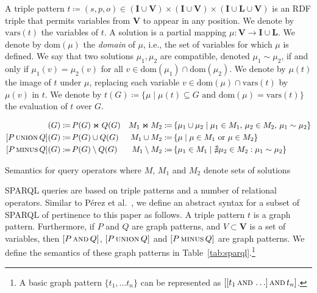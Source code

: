 \documentclass{llncs}
\newcommand{\I}{\ensuremath{\mathbf{I}}\xspace}
\renewcommand{\L}{\ensuremath{\mathbf{L}}\xspace}
\newcommand{\V}{\ensuremath{\mathbf{V}}\xspace}
\newcommand{\ssyn}[3]{[\ensuremath{#1\,\textsc{#2}\,#3}]}
\newcommand{\sand}[2]{\ssyn{#1}{and}{#2}}
\newcommand{\suni}[2]{\ssyn{#1}{union}{#2}}
\newcommand{\sminus}[2]{\ssyn{#1}{minus}{#2}}
\newcommand{\ssel}[2]{\ensuremath{\textsc{select}_{#2}#1}}
\newcommand{\dom}[1]{\ensuremath{\mathrm{dom}(#1)}}
\newcommand{\vars}[1]{\ensuremath{\mathrm{vars}(#1)}}
\newcommand{\com}[2]{\ensuremath{#1 \sim #2}}
\def\ojoin{\setbox0=\hbox{$\bowtie$}%
	\rule[0.18ex]{.25em}{.5pt}\llap{\rule[.9ex]{.25em}{.5pt}}}
\def\loj{\mathbin{\ojoin\mkern-5.8mu\bowtie}}
\newcommand{\da}{\ensuremath{:\nolinebreak\mkern-1.2mu\nolinebreak=}}
\begin{document}
A triple pattern $t \coloneqq (s,p,o) \in (\I \cup \V) \times (\I \cup \V) \times (\I \cup \L \cup \V)$ is an RDF triple that permits variables from $\V$ to appear in any position. We denote by $\vars{t}$ the variables of $t$. A solution is a partial mapping $\mu : \V \rightarrow \I \cup \L$. We denote by $\dom{\mu}$ the \textit{domain} of $\mu$, i.e., the set of variables for which $\mu$ is defined. We say that two solutions $\mu_1, \mu_2$ are compatible, denoted $\mu_1 \sim \mu_2$, if and only if $\mu_1(v) = \mu_2(v)$ for all $v \in \dom{\mu_1} \cap \dom{\mu_2}$. We denote by $\mu(t)$ the image of $t$ under $\mu$, replacing each variable $v \in \dom{\mu} \cap \vars{t}$ by $\mu(v)$ in $t$. We denote by $t(G) \coloneqq \{ \mu \mid \mu(t) \subseteq G\text{ and }\dom{\mu} = \vars{t} \}$ the evaluation of $t$ over $G$.

\begin{table}[t]
{\footnotesize
\begin{align*}
\sand{P}{Q}(G) \da &\, P(G) \Join Q(G) & M_1 \Join M_2 \da &\, \{ \mu_1 \cup \mu_2 \mid \mu_1 \in M_1,\, \mu_2 \in M_2,\, \com{\mu_1}{\mu_2} \} \\
\suni{P}{Q}(G) \da &\, P(G) \cup Q(G) & M_1 \cup M_2 \da &\, \{ \mu \mid \mu \in M_1\text{ or }\mu \in M_2 \} \\
\sminus{P}{Q}(G) \da &\, P(G) \setminus Q(G) &  M_1 \setminus M_2 \da &\, \{ \mu_1 \in M_1 \mid \nexists \mu_2 \in M_2 : \com{\mu_1}{\mu_2} \} \\
\end{align*}}
\vspace{-1cm}
\caption{Semantics for query operators where $M$, $M_1$ and $M_2$ denote sets of solutions\label{tab:sparql}}
\end{table}

SPARQL queries are based on triple patterns and a number of relational operators. Similar to Pérez et al.~\cite{PerezAG09}, we define an abstract syntax for a subset of SPARQL of pertinence to this paper as follows. A triple pattern $t$ is a graph pattern. Furthermore, if $P$ and $Q$ are graph patterns, and $V \subset \V$ is a set of variables, then $\sand{P}{Q}$, $\suni{P}{Q}$ and $\sminus{P}{Q}$ are graph patterns. We define the semantics of these graph patterns in Table~\ref{tab:sparql}.\footnote{A basic graph pattern $\{ t_1, \ldots t_n\}$ can be represented as $\sand{\sand{t_1}{\ldots}}{t_n}$.}
\end{document}
